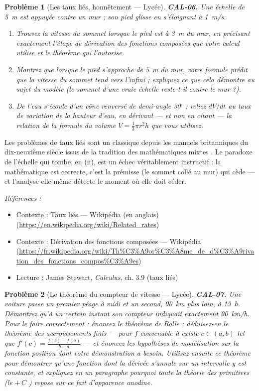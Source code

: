 \documentclass[11pt]{article}
\newtheorem{problem}{Problème}
\newenvironment{refs}{\par\small\noindent\emph{Références :}\begin{itemize}\setlength\itemsep{0pt}}{\end{itemize}\normalsize}
\begin{document}
\begin{problem}[{Les taux liés, honnêtement --- Lycée}]
\textbf{CAL-06.} Une échelle de 5~m est appuyée contre un mur ; son pied
glisse en s'éloignant à 1~m/s.
\begin{enumerate}
\item[(i)] Trouvez la vitesse du sommet lorsque le pied est à 3~m
du mur, en précisant exactement l'étape de dérivation des fonctions composées que votre calcul utilise et le théorème qui
l'autorise.
\item[(ii)] Montrez que lorsque le pied s'approche de 5~m du mur, votre formule
prédit que la vitesse du sommet tend vers l'infini ; expliquez ce que cela démontre au sujet du modèle
(le sommet d'une vraie échelle reste-t-il contre le mur ?).
\item[(iii)] De l'eau s'écoule d'un
cône renversé de demi-angle 30$^\circ$ : reliez $ dV/dt $ au taux de variation de la hauteur d'eau,
en dérivant --- et non en citant --- la relation de la formule du volume $ V = \tfrac{1}{3}\pi r^2 h $
que vous utilisez.
\end{enumerate}

\end{problem}

\noindent Les problèmes de taux liés sont un classique depuis les manuels britanniques du
dix-neuvième siècle issus de la tradition des \og{} mathématiques mixtes \fg{}. Le paradoxe de l'échelle
qui tombe, en (ii), est un échec véritablement instructif : la mathématique est correcte, c'est la
prémisse (le sommet collé au mur) qui cède --- et l'analyse elle-même détecte le moment
où elle doit céder.

\begin{refs}
\item Contexte : Taux liés --- Wikipédia (en anglais) (\url{https://en.wikipedia.org/wiki/Related_rates})
\item Contexte : Dérivation des fonctions composées --- Wikipédia (\url{https://fr.wikipedia.org/wiki/Th%C3%A9or%C3%A8me_de_d%C3%A9rivation_des_fonctions_compos%C3%A9es})
\item Lecture : James Stewart, \textit{Calculus}, ch. 3.9 (taux liés)
\end{refs}

\bigskip

\begin{problem}[{Le théorème du compteur de vitesse --- Lycée}]
\textbf{CAL-07.} Une voiture passe un premier péage à midi et un second,
90~km plus loin, à 13~h. Démontrez qu'à un certain instant son compteur indiquait
exactement 90~km/h. Pour le faire correctement : énoncez le théorème de Rolle ; déduisez-en le
théorème des accroissements finis --- pour $ f $ convenable il existe $ c\in(a,b) $ tel que
$ f'(c) = \frac{f(b)-f(a)}{b-a} $ --- et énoncez les hypothèses de modélisation sur la fonction
position dont votre démonstration a besoin. Utilisez ensuite ce théorème pour démontrer qu'une fonction dont la dérivée
s'annule sur un intervalle y est constante, et expliquez en un paragraphe pourquoi toute la
théorie des primitives (le \og{} $ +\,C $ \fg{}) repose sur ce fait d'apparence anodine.
\end{problem}
\end{document}

